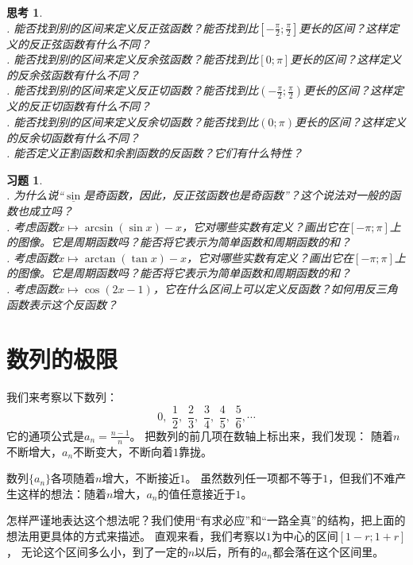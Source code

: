 \documentclass[12pt,UTF8]{ctexbook}
\newtheorem{sk}{思考}[section]
\newtheorem{xt}{习题}[section]
\begin{document}
\begin{sk}
    \mbox{} \\
    . 能否找到别的区间来定义反正弦函数？能否找到比$[-\frac{\pi}{2};\frac{\pi}{2}]$更长的区间？这样定义的反正弦函数有什么不同？\\
    . 能否找到别的区间来定义反余弦函数？能否找到比$[0; \pi]$更长的区间？这样定义的反余弦函数有什么不同？\\
    . 能否找到别的区间来定义反正切函数？能否找到比$(-\frac{\pi}{2};\frac{\pi}{2})$更长的区间？这样定义的反正切函数有什么不同？\\
    . 能否找到别的区间来定义反余切函数？能否找到比$(0;\pi)$更长的区间？这样定义的反余切函数有什么不同？\\
    . 能否定义正割函数和余割函数的反函数？它们有什么特性？
\end{sk}
\begin{xt}
    \mbox{} \\
    . 为什么说“$\underline{\sin}$是奇函数，因此，反正弦函数也是奇函数”？这个说法对一般的函数也成立吗？\\
    . 考虑函数$x\mapsto \arcsin{(\sin{x})} - x$，它对哪些实数有定义？画出它在$[-\pi; \pi]$上的图像。它是周期函数吗？能否将它表示为简单函数和周期函数的和？\\
    . 考虑函数$x\mapsto \arctan{(\tan{x})} - x$，它对哪些实数有定义？画出它在$[-\pi; \pi]$上的图像。它是周期函数吗？能否将它表示为简单函数和周期函数的和？\\
    . 考虑函数$x\mapsto \cos(2x - 1)$，它在什么区间上可以定义反函数？如何用反三角函数表示这个反函数？
\end{xt}

\chapter{数列的极限}

我们来考察以下数列：
$$ 0,\,\, \frac{1}{2}, \,\,\frac{2}{3},\,\, \frac{3}{4}, \,\,\frac{4}{5}, \,\,\frac{5}{6}, \cdots $$
它的通项公式是$a_n = \frac{n-1}{n}$。
把数列的前几项在数轴上标出来，我们发现：
随着$n$不断增大，$a_n$不断变大，不断向着$1$靠拢。

数列$\{a_n\}$各项随着$n$增大，不断接近$1$。
虽然数列任一项都不等于$1$，但我们不难产生这样的想法：随着$n$增大，$a_n$的值任意接近于$1$。

怎样严谨地表达这个想法呢？我们使用“有求必应”和“一路全真”的结构，把上面的想法用更具体的方式来描述。
直观来看，我们考察以$1$为中心的区间$[1-r;1+r]$，
无论这个区间多么小，到了一定的$n$以后，所有的$a_n$都会落在这个区间里。
\end{document}

